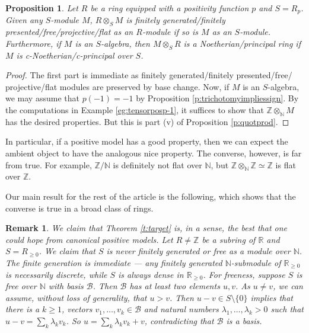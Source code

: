 \documentclass[notitlepage, 10pt]{article}
\theoremstyle{defin}
\theoremstyle{theo}
\newtheorem{prop}[defn]{Proposition}
\theoremstyle{rema}
\newtheorem{rem}{Remark}[section]
\newcommand{\R}{\mathbb{R}}
\newcommand{\N}{\mathbb{N}}
\newcommand{\Z}{\mathbb{Z}}
\begin{document}
\begin{prop}\label{p:posmod}
    Let $R$ be a ring equipped with a positivity function $p$ and $S = R_p$. Given any $S$-module $M$, $R\otimes_S M$ is finitely generated/finitely presented/free/projective/flat as an $R$-module if so is $M$ as an $S$-module. Furthermore, if $M$ is an $S$-algebra, then $M\otimes_S R$ is a Noetherian/principal ring if $M$ is c-Noetherian/c-principal over $S$.
\end{prop}

\begin{proof}
    The first part is immediate as finitely generated/finitely presented/free/ projective/flat modules are preserved by base change. Now, if $M$ is an $S$-algebra, we may assume that $p(-1)=-1$ by Proposition \ref{p:trichotomyimpliessign}. By the computations in Example \ref{eg:tensorposp-1}, it suffices to show that $\Z\otimes_\N M$ has the desired properties. But this is part (v) of Proposition \ref{p:quotprod}.
\end{proof}

In particular, if a positive model has a good property, then we can expect the ambient object to have the analogous nice property. The converse, however, is far from true. For example, $\Z/\N$ is definitely not flat over $\N$, but $\Z\otimes_\N \Z \simeq \Z$ is flat over $\Z$.

Our main result for the rest of the article is the following, which shows that the converse is true in a broad class of rings.

\ttarget*

\begin{rem}
    We claim that Theorem \ref{t:target} is, in a sense, the best that one could hope from canonical positive models. Let $R\neq \Z$ be a subring of $\R$ and $S=R_{\geq 0}$. We claim that $S$ is never finitely generated or free as a module over $\N$. The finite generation is immediate --- any finitely generated $\N$-submodule of $\R_{\geq 0}$ is necessarily discrete, while $S$ is always dense in $\R_{\geq 0}$. For freeness, suppose $S$ is free over $\N$ with basis $\mathcal{B}$. Then $\mathcal{B}$ has at least two elements $u, v$. As $u\neq v$, we can assume, without loss of generality, that $u>v$. Then $u-v\in S\setminus\{0\}$ implies that there is a $k\geq 1$, vectors $v_1,\ldots, v_k\in \mathcal{B}$ and natural numbers $\lambda_1,\ldots, \lambda_k>0$ such that $u-v = \sum_{k} \lambda_kv_k$. So $u = \sum_{k} \lambda_k v_k + v$, contradicting that $\mathcal{B}$ is a basis.
\end{rem}
\end{document}
